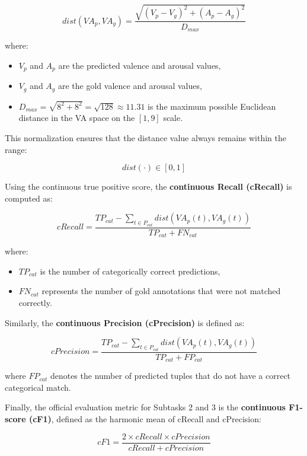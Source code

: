 \documentclass{article}
\begin{document}
\begin{equation}
dist(VA_p, VA_g) = \frac{\sqrt{(V_p - V_g)^2 + (A_p - A_g)^2}}{D_{max}}
\end{equation}

where:
\begin{itemize}
    \item $V_p$ and $A_p$ are the predicted valence and arousal values,
    \item $V_g$ and $A_g$ are the gold valence and arousal values,
    \item $D_{max} = \sqrt{8^2 + 8^2} = \sqrt{128} \approx 11.31$ is the maximum possible Euclidean distance in the VA space on the $[1,9]$ scale.
\end{itemize}

This normalization ensures that the distance value always remains within the range:

\begin{equation}
dist(\cdot) \in [0,1]
\end{equation}

Using the continuous true positive score, the \textbf{continuous Recall (cRecall)} is computed as:

\begin{equation}
cRecall =
\frac{
TP_{cat} -
\sum_{t \in P_{cat}}
dist(VA_p(t), VA_g(t))
}{
TP_{cat} + FN_{cat}
}
\end{equation}

where:
\begin{itemize}
    \item $TP_{cat}$ is the number of categorically correct predictions,
    \item $FN_{cat}$ represents the number of gold annotations that were not matched correctly.
\end{itemize}

Similarly, the \textbf{continuous Precision (cPrecision)} is defined as:

\begin{equation}
cPrecision =
\frac{
TP_{cat} -
\sum_{t \in P_{cat}}
dist(VA_p(t), VA_g(t))
}{
TP_{cat} + FP_{cat}
}
\end{equation}

where $FP_{cat}$ denotes the number of predicted tuples that do not have a correct categorical match.

Finally, the official evaluation metric for Subtasks 2 and 3 is the \textbf{continuous F1-score (cF1)}, defined as the harmonic mean of cRecall and cPrecision:

\begin{equation}
cF1 =
\frac{
2 \times cRecall \times cPrecision
}{
cRecall + cPrecision
}
\end{equation}
\end{document}
